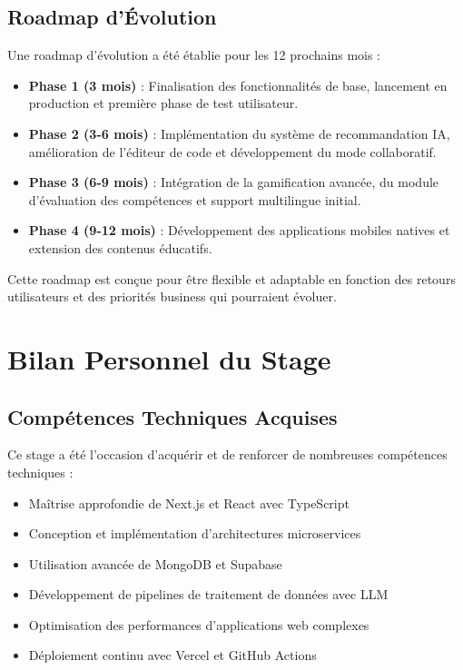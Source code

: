 \subsection{Roadmap d'Évolution}
Une roadmap d'évolution a été établie pour les 12 prochains mois :

\begin{itemize}
  \item \textbf{Phase 1 (3 mois)} : Finalisation des fonctionnalités de base, lancement en production et première phase de test utilisateur.
  
  \item \textbf{Phase 2 (3-6 mois)} : Implémentation du système de recommandation IA, amélioration de l'éditeur de code et développement du mode collaboratif.
  
  \item \textbf{Phase 3 (6-9 mois)} : Intégration de la gamification avancée, du module d'évaluation des compétences et support multilingue initial.
  
  \item \textbf{Phase 4 (9-12 mois)} : Développement des applications mobiles natives et extension des contenus éducatifs.
\end{itemize}

Cette roadmap est conçue pour être flexible et adaptable en fonction des retours utilisateurs et des priorités business qui pourraient évoluer.

\section{Bilan Personnel du Stage}

\subsection{Compétences Techniques Acquises}
Ce stage a été l'occasion d'acquérir et de renforcer de nombreuses compétences techniques :

\begin{itemize}
  \item Maîtrise approfondie de Next.js et React avec TypeScript
  \item Conception et implémentation d'architectures microservices
  \item Utilisation avancée de MongoDB et Supabase
  \item Développement de pipelines de traitement de données avec LLM
  \item Optimisation des performances d'applications web complexes
  \item Déploiement continu avec Vercel et GitHub Actions
\end{itemize}

